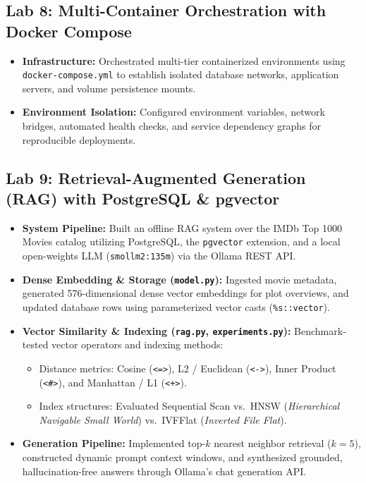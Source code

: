 \documentclass[10pt,a4paper]{article}
\begin{document}
\subsection{Lab 8: Multi-Container Orchestration with Docker Compose}
\begin{itemize}
    \item \textbf{Infrastructure:} Orchestrated multi-tier containerized environments using \texttt{docker-compose.yml} to establish isolated database networks, application servers, and volume persistence mounts.
    \item \textbf{Environment Isolation:} Configured environment variables, network bridges, automated health checks, and service dependency graphs for reproducible deployments.
\end{itemize}

\subsection{Lab 9: Retrieval-Augmented Generation (RAG) with PostgreSQL \& pgvector}
\begin{itemize}
    \item \textbf{System Pipeline:} Built an offline RAG system over the IMDb Top 1000 Movies catalog utilizing PostgreSQL, the \texttt{pgvector} extension, and a local open-weights LLM (\texttt{smollm2:135m}) via the Ollama REST API.
    \item \textbf{Dense Embedding \& Storage (\texttt{model.py}):} Ingested movie metadata, generated 576-dimensional dense vector embeddings for plot overviews, and updated database rows using parameterized vector casts (\texttt{\%s::vector}).
    \item \textbf{Vector Similarity \& Indexing (\texttt{rag.py}, \texttt{experiments.py}):} Benchmark-tested vector operators and indexing methods:
    \begin{itemize}
        \item Distance metrics: Cosine (\texttt{<=>}), L2 / Euclidean (\texttt{<->}), Inner Product (\texttt{<\#>}), and Manhattan / L1 (\texttt{<+>}).
        \item Index structures: Evaluated Sequential Scan vs.\ HNSW (\textit{Hierarchical Navigable Small World}) vs.\ IVFFlat (\textit{Inverted File Flat}).
    \end{itemize}
    \item \textbf{Generation Pipeline:} Implemented top-$k$ nearest neighbor retrieval ($k=5$), constructed dynamic prompt context windows, and synthesized grounded, hallucination-free answers through Ollama's chat generation API.
\end{itemize}
\end{document}
